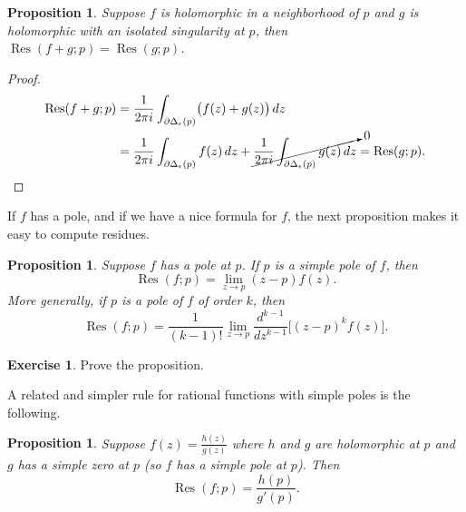 \documentclass[12pt,openany]{book}
\theoremstyle{plain}
\newtheorem{prop}[thm]{Proposition}
\theoremstyle{remark}
\theoremstyle{definition}
\newenvironment{exbox}{%
    \def\FrameCommand{\vrule width 1pt \relax\hspace{10pt}}%
    \MakeFramed{\advance\hsize-\width\FrameRestore}%
}{%
    \endMakeFramed
}
\theoremstyle{exercise}
\newtheorem{exercise}{Exercise}[section]
\theoremstyle{example}
\begin{document}
\begin{prop}
Suppose $f$ is holomorphic in a neighborhood of $p$ and $g$ is holomorphic
with an isolated singularity at $p$, then
$\operatorname{Res}(f+g;p) = \operatorname{Res}(g;p)$.
\end{prop}

\begin{proof}
\begin{equation*}
\begin{split}
\operatorname{Res}(f+g;p)
& =
\frac{1}{2\pi i}
\int_{\partial \Delta_{\epsilon}(p)}
\bigl(f(z)+g(z)\bigr) \, dz
\\
& =
\frac{1}{2\pi i}
\int_{\partial \Delta_{\epsilon}(p)}
f(z) \, dz
+
\cancelto{0}{
\frac{1}{2\pi i}
\int_{\partial \Delta_{\epsilon}(p)}
g(z) \, dz
}
=
\operatorname{Res}(g;p) . \qedhere
\end{split}
\end{equation*}
\end{proof}

If $f$ has a pole, and if we have a nice formula for $f$,
the next proposition makes it easy to compute residues.

\begin{prop}
Suppose $f$ has a pole at $p$.
If $p$ is a simple pole of $f$, then
\begin{equation*}
\operatorname{Res}(f;p) = \lim_{z\to p} (z-p) f(z) .
\end{equation*}
More generally, if $p$ is a pole of $f$ of order $k$, then
\begin{equation*}
\operatorname{Res}(f;p) = \frac{1}{(k-1)!} \lim_{z\to p}
\frac{d^{k-1}}{dz^{k-1}}\bigl[ (z-p)^{k} f(z) \bigr] .
\end{equation*}
\end{prop}

\begin{exbox}
\begin{exercise}
Prove the proposition.
\end{exercise}
\end{exbox}

A related and simpler rule for rational functions with simple poles is
the following.

\begin{prop} \label{prop:residuesimpleratio}
Suppose $f(z) = \frac{h(z)}{g(z)}$ where $h$ and $g$ are holomorphic
at $p$ and $g$ has a simple zero at $p$ (so $f$ has a simple pole at $p$).
Then
\begin{equation*}
\operatorname{Res}(f;p) = \frac{h(p)}{g'(p)} .
\end{equation*}
\end{prop}
\end{document}
